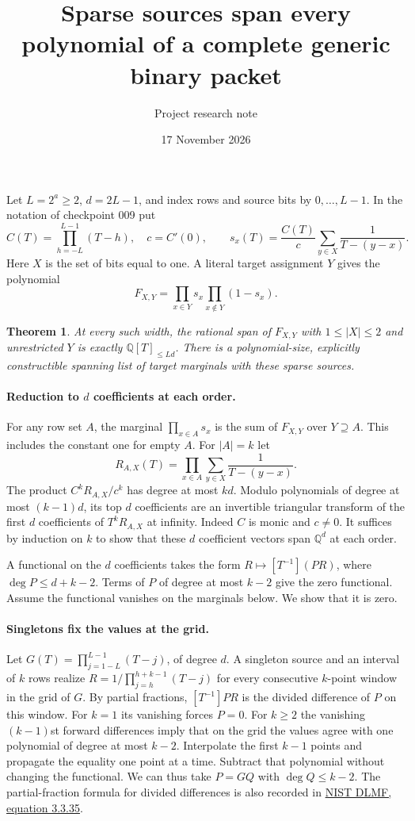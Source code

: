 \documentclass[11pt]{article}
\title{Sparse sources span every polynomial of a complete generic binary packet}
\author{Project research note}
\date{17 November 2026}
\newtheorem{theorem}{Theorem}
\newcommand{\QQ}{\mathbb Q}
\begin{document}
\maketitle

Let $L=2^a\ge2$, $d=2L-1$, and index rows and source bits by
$0,\ldots,L-1$. In the notation of checkpoint 009 put
\[
 C(T)=\prod_{h=-L}^{L-1}(T-h),\quad c=C'(0),\qquad
 s_x(T)=\frac{C(T)}c\sum_{y\in X}\frac1{T-(y-x)} .
\]
Here $X$ is the set of bits equal to one. A literal target assignment $Y$
gives the polynomial
\[
 F_{X,Y}=\prod_{x\in Y}s_x\prod_{x\notin Y}(1-s_x).
\]

\begin{theorem}
At every such width, the rational span of $F_{X,Y}$ with
$1\le |X|\le 2$ and unrestricted $Y$ is exactly $\QQ[T]_{\le Ld}$.
There is a polynomial-size, explicitly constructible spanning list of
target marginals with these sparse sources.
\end{theorem}

\paragraph{Reduction to $d$ coefficients at each order.}
For any row set $A$, the marginal $\prod_{x\in A}s_x$ is the sum of
$F_{X,Y}$ over $Y\supseteq A$. This includes the constant one for empty
$A$. For $|A|=k$ let
\[
 R_{A,X}(T)=\prod_{x\in A}\sum_{y\in X}\frac1{T-(y-x)} .
\]
The product $C^k R_{A,X}/c^k$ has degree at most $kd$. Modulo polynomials
of degree at most $(k-1)d$, its top $d$ coefficients are an invertible
triangular transform of the first $d$ coefficients of $T^kR_{A,X}$ at
infinity. Indeed $C$ is monic and $c\ne0$. It suffices by induction on
$k$ to show that these $d$ coefficient vectors span $\QQ^d$ at each order.

A functional on the $d$ coefficients takes the form
$R\mapsto[T^{-1}](P R)$, where $\deg P\le d+k-2$. Terms of $P$ of
degree at most $k-2$ give the zero functional. Assume the functional
vanishes on the marginals below. We show that it is zero.

\paragraph{Singletons fix the values at the grid.}
Let $G(T)=\prod_{j=1-L}^{L-1}(T-j)$, of degree $d$.
A singleton source and an interval of $k$ rows realize
$R=1/\prod_{j=h}^{h+k-1}(T-j)$ for every consecutive $k$-point
window in the grid of $G$. By partial fractions, $[T^{-1}]PR$ is the
divided difference of $P$ on this window. For $k=1$ its vanishing forces
$P=0$. For $k\ge2$ the vanishing $(k-1)$st forward differences imply
that on the grid the values agree with one polynomial of degree at most
$k-2$. Interpolate the first $k-1$ points and propagate the equality
one point at a time. Subtract that polynomial without changing the
functional. We can thus take $P=GQ$ with $\deg Q\le k-2$.
The partial-fraction formula for divided differences is also recorded
in \href{https://dlmf.nist.gov/3.3.E35}{NIST DLMF, equation 3.3.35}.
\end{document}
